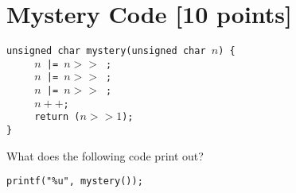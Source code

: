 \newpage
\section{Mystery Code [10 points]}

\texttt{unsigned char mystery(unsigned char $n$) \{ }\\
\hspace*{0.5ex}\texttt{$\qquad$   $n$ |= $n >> $ \VARA{};} \\
\hspace*{0.5ex}\texttt{$\qquad$    $n$ |= $n >> $ \VARB{};} \\
\hspace*{0.5ex}\texttt{$\qquad$  $n$ |= $n >>$ \VARC{};} \\
\hspace*{0.5ex}\texttt{$\qquad$   $n++$;} \\
\hspace*{0.5ex}\texttt{$\qquad$ return ($n >> 1$);} \\
\texttt{\}}

What does the following code print out?

\hspace*{0.5ex}\texttt{printf("\%u", mystery(\VARTEST{})); }
	
		
